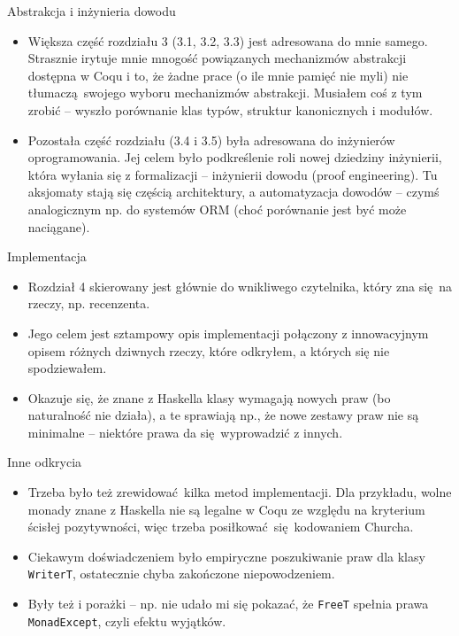 \documentclass{beamer}
\begin{document}
\begin{frame}{Abstrakcja i inżynieria dowodu}
\begin{itemize}
	\item Większa część rozdziału 3 (3.1, 3.2, 3.3) jest adresowana do mnie samego. Strasznie irytuje mnie mnogość powiązanych mechanizmów abstrakcji dostępna w Coqu i to, że żadne prace (o ile mnie pamięć nie myli) nie tłumaczą swojego wyboru mechanizmów abstrakcji. Musiałem coś z tym zrobić -- wyszło porównanie klas typów, struktur kanonicznych i modułów.
	\item Pozostała część rozdziału (3.4 i 3.5) była adresowana do inżynierów oprogramowania. Jej celem było podkreślenie roli nowej dziedziny inżynierii, która wyłania się z formalizacji -- inżynierii dowodu (proof engineering). Tu aksjomaty stają się częścią architektury, a automatyzacja dowodów -- czymś analogicznym np. do systemów ORM (choć porównanie jest być może naciągane).
\end{itemize}
\end{frame}

\begin{frame}{Implementacja}
\begin{itemize}
	\item Rozdział 4 skierowany jest głównie do wnikliwego czytelnika, który zna się na rzeczy, np. recenzenta.
	\item Jego celem jest sztampowy opis implementacji połączony z innowacyjnym opisem różnych dziwnych rzeczy, które odkryłem, a których się nie spodziewałem.
	\item Okazuje się, że znane z Haskella klasy wymagają nowych praw (bo naturalność nie działa), a te sprawiają np., że nowe zestawy praw nie są minimalne -- niektóre prawa da się wyprowadzić z innych.
\end{itemize}
\end{frame}

\begin{frame}{Inne odkrycia}
\begin{itemize}
	\item Trzeba było też zrewidować kilka metod implementacji. Dla przykładu, wolne monady znane z Haskella nie są legalne w Coqu ze względu na kryterium ścisłej pozytywności, więc trzeba posiłkować się kodowaniem Churcha.
	\item Ciekawym doświadczeniem było empiryczne poszukiwanie praw dla klasy \texttt{WriterT}, ostatecznie chyba zakończone niepowodzeniem.
	\item Były też i porażki -- np. nie udało mi się pokazać, że \texttt{FreeT} spełnia prawa \texttt{MonadExcept}, czyli efektu wyjątków.
\end{itemize}
\end{frame}
\end{document}
